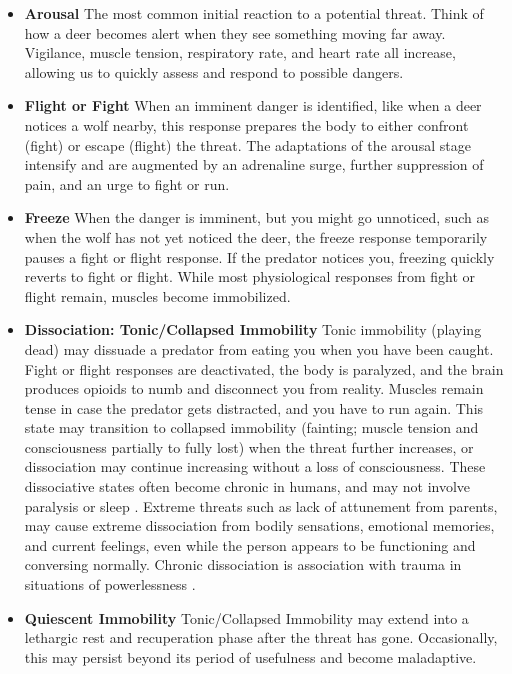 \documentclass[12pt,letterpaper]{article}
\begin{document}
\begin{itemize}
    \item \textbf{Arousal} The most common initial reaction to a potential threat. Think of how a deer becomes alert when they see something moving far away. Vigilance, muscle tension, respiratory rate, and heart rate all increase, allowing us to quickly assess and respond to possible dangers.
    \item \textbf{Flight or Fight} When an imminent danger is identified, like when a deer notices a wolf nearby, this response prepares the body to either confront (fight) or escape (flight) the threat. The adaptations of the arousal stage intensify and are augmented by an adrenaline surge, further suppression of pain, and an urge to fight or run.
    \item \textbf{Freeze} When the danger is imminent, but you might go unnoticed, such as when the wolf has not yet noticed the deer, the freeze response temporarily pauses a fight or flight response. If the predator notices you, freezing quickly reverts to fight or flight. While most physiological responses from fight or flight remain, muscles become immobilized.
    \item \textbf{Dissociation: Tonic/Collapsed Immobility} Tonic immobility (playing dead) may dissuade a predator from eating you when you have been caught. Fight or flight responses are deactivated, the body is paralyzed, and the brain produces opioids to numb and disconnect you from reality. Muscles remain tense in case the predator gets distracted, and you have to run again. This state may transition to collapsed immobility (fainting; muscle tension and consciousness partially to fully lost) when the threat further increases, or dissociation may continue increasing without a loss of consciousness. These dissociative states often become chronic in humans, and may not involve paralysis or sleep \cite{razviPSIP}. Extreme threats such as lack of attunement from parents, may cause extreme dissociation from bodily sensations, emotional memories, and current feelings, even while the person appears to be functioning and conversing normally. Chronic dissociation is association with trauma in situations of powerlessness \cite{loewensteinDissociation}. 
    \item \textbf{Quiescent Immobility} Tonic/Collapsed Immobility may extend into a lethargic rest and recuperation phase after the threat has gone. Occasionally, this may persist beyond its period of usefulness and become maladaptive.
\end{itemize}
\end{document}
